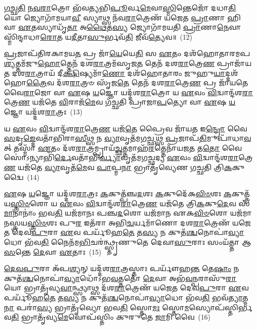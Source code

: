 \-\ul{𑌗}\-\-\ul{𑌚𑍍𑌛}\-\-\ul{𑌤𑌿} \ul{𑌨}\-\-\ul{𑌵}\-\-\ul{𑌰𑌾}\-𑌤𑍍𑌰𑍋 𑌭᳴𑌵𑌤𑍍𑌯𑌭𑌿\-\ul{𑌪𑍂}\-𑌰𑍍𑌵\-\ul{𑌮𑍇}\-𑌵𑌾\-\ul{𑌸𑍍𑌮𑌿}\-𑌨𑍍𑌤𑍇𑌜𑍋᳴ 𑌦𑌧𑌾\-\ul{𑌤𑌿} 𑌯𑍋 𑌜𑍍𑌯𑍋𑌗𑌾᳴𑌮𑌯𑌾\-\ul{𑌵𑍀} 𑌸𑍍𑌯𑌾𑌥𑍍𑌸 𑌨᳴𑌵\-\ul{𑌰𑌾}\-𑌤𑍍𑌰𑍇𑌣᳴ 𑌯𑌜𑍇𑌤 \ul{𑌪𑍍𑌰𑌾}\-𑌣𑌾 𑌹𑌿 𑌵𑌾 \ul{𑌏}\-𑌤𑌸𑍍𑌯𑌾𑌧𑍃᳴\-\ul{𑌤𑌾} 𑌅\-\ul{𑌥𑍈}\-𑌤\-\ul{𑌸𑍍𑌯} 𑌜𑍍𑌯𑍋𑌗𑌾᳴𑌮𑌯𑌤𑌿 \ul{𑌪𑍍𑌰𑌾}\-𑌣𑌾\-\ul{𑌨𑍇}\-𑌵𑌾𑌸𑍍𑌮𑌿᳴𑌨𑍍𑌦𑌾𑌧𑌾\-\ul{𑌰𑍋}\-𑌤 𑌯\-\ul{𑌦𑍀}\-𑌤𑌾\-\ul{𑌸𑍁}\-𑌰𑍍𑌭𑌵᳴\-\ul{𑌤𑌿} 𑌜𑍀𑌵᳴\-\ul{𑌤𑍍𑌯𑍇}\-𑌵॥~(12)

{\anuvakamend[{𑌕𑌲𑍍𑌪᳴𑌨𑍍𑌤𑍇 \ul{𑌪𑍍𑌰}\-𑌜𑌾\-\ul{𑌨𑌾}\-𑌨𑍍𑌤𑍍𑌰𑌯᳴𑌸𑍍𑌤𑍍𑌰𑌿𑍞𑌶𑌚𑍍𑌚}]}%

\-\ul{𑌪𑍍𑌰}\-𑌜𑌾𑌪᳴𑌤𑌿𑌰𑌕𑌾𑌮𑌯\-\ul{𑌤} 𑌪𑍍𑌰 𑌜𑌾᳴\-\ul{𑌯𑍇}\-𑌯𑍇\-\ul{𑌤𑌿} 𑌸 \ul{𑌏}\-𑌤𑌂 𑌦𑌶᳴𑌹𑍋𑌤𑌾𑌰𑌮𑌪\-\ul{𑌶𑍍𑌯}\-𑌤𑍍𑌤𑌮᳴𑌜𑍁\-\ul{𑌹𑍋}\-𑌤𑍍𑌤𑍇𑌨᳴ 𑌦𑌶\-\ul{𑌰𑌾}\-𑌤𑍍𑌰𑌮᳴𑌸𑍃𑌜\-\ul{𑌤} 𑌤𑍇𑌨᳴ 𑌦𑌶\-\ul{𑌰𑌾}\-𑌤𑍍𑌰𑍇\-\ul{𑌣} 𑌪𑍍𑌰𑌾𑌜𑌾᳴𑌯𑌤 𑌦𑌶\-\ul{𑌰𑌾}\-𑌤𑍍𑌰𑌾𑌯᳴ 𑌦𑍀\-\ul{𑌕𑍍𑌷𑌿}\-𑌷𑍍𑌯𑌮𑌾᳴\-\ul{𑌣𑍋} 𑌦𑌶᳴𑌹𑍋𑌤𑌾𑌰𑌂 𑌜𑍁𑌹𑍁\-\ul{𑌯𑌾}\-𑌦𑍍𑌦𑌶᳴𑌹𑍋\-\ul{𑌤𑍍𑌰𑍈}\-𑌵 𑌦᳴𑌶\-\ul{𑌰𑌾}\-𑌤𑍍𑌰𑍞 𑌸𑍃᳴𑌜\-\ul{𑌤𑍇} 𑌤𑍇𑌨᳴ 𑌦𑌶\-\ul{𑌰𑌾}\-𑌤𑍍𑌰𑍇\-\ul{𑌣} 𑌪𑍍𑌰 𑌜𑌾᳴𑌯𑌤𑍇 𑌵𑍈\-\ul{𑌰𑌾}\-𑌜𑍋 𑌵𑌾 \ul{𑌏}\-𑌷 \ul{𑌯}\-𑌜𑍍𑌞𑍋 𑌯𑌦𑍍𑌦᳴𑌶\-\ul{𑌰𑌾}\-𑌤𑍍𑌰𑍋 𑌯 \ul{𑌏}\-𑌵𑌂 \ul{𑌵𑌿}\-𑌦𑍍𑌵𑌾𑌨𑍍𑌦᳴𑌶\-\ul{𑌰𑌾}\-𑌤𑍍𑌰𑍇\-\ul{𑌣} 𑌯𑌜᳴𑌤𑍇 \ul{𑌵𑌿}\-𑌰𑌾𑌜᳴\-\ul{𑌮𑍇}\-𑌵 𑌗᳴𑌚𑍍𑌛𑌤𑌿 𑌪𑍍𑌰𑌾𑌜𑌾\-\ul{𑌪}\-𑌤𑍍𑌯𑍋 𑌵𑌾 \ul{𑌏}\-𑌷 \ul{𑌯}\-𑌜𑍍𑌞𑍋 𑌯𑌦𑍍𑌦᳴𑌶\-\ul{𑌰𑌾}\-𑌤𑍍𑌰𑌃~(13)

𑌯 \ul{𑌏}\-𑌵𑌂 \ul{𑌵𑌿}\-𑌦𑍍𑌵𑌾𑌨𑍍𑌦᳴𑌶\-\ul{𑌰𑌾}\-𑌤𑍍𑌰𑍇\-\ul{𑌣} 𑌯𑌜᳴\-\ul{𑌤𑍇} 𑌪𑍍𑌰𑍈𑌵 𑌜𑌾᳴𑌯\-\ul{𑌤} 𑌇\-\ul{𑌨𑍍𑌦𑍍𑌰𑍋} 𑌵𑍈 \ul{𑌸}\-𑌦𑍃\-\ul{𑌙𑍍𑌦𑍇}\-𑌵𑌤𑌾᳴𑌭𑌿𑌰𑌾\-\ul{𑌸𑍀}\-𑌥𑍍𑌸 𑌨 \ul{𑌵𑍍𑌯𑌾}\-𑌵𑍃𑌤᳴𑌮𑌗\-\ul{𑌚𑍍𑌛}\-𑌥𑍍𑌸 \ul{𑌪𑍍𑌰}\-𑌜𑌾𑌪᳴\-\ul{𑌤𑌿}\-𑌮𑍁𑌪𑌾᳴𑌧𑌾\-\ul{𑌵}\-𑌤𑍍 𑌤𑌸𑍍𑌮𑌾᳴ \ul{𑌏}\-𑌤𑌂 𑌦᳴𑌶\-\ul{𑌰𑌾}\-𑌤𑍍𑌰𑌮𑍍𑌪𑍍𑌰𑌾𑌯᳴\-\ul{𑌚𑍍𑌛}\-𑌤𑍍𑌤𑌮𑌾𑌹᳴\-\ul{𑌰}\-𑌤𑍍𑌤𑍇𑌨𑌾᳴𑌯𑌜\-\ul{𑌤} 𑌤\-\ul{𑌤𑍋} 𑌵𑍈 𑌸𑍋॑\-𑌽𑌨𑍍𑌯𑌾𑌭𑌿᳴\-\ul{𑌰𑍍𑌦𑍇}\-𑌵𑌤𑌾᳴𑌭𑌿\-\ul{𑌰𑍍𑌵𑍍𑌯𑌾}\-𑌵𑍃𑌤᳴𑌮𑌗\-\ul{𑌚𑍍𑌛}\-𑌦𑍍𑌯 \ul{𑌏}\-𑌵𑌂 \ul{𑌵𑌿}\-𑌦𑍍𑌵𑌾𑌨𑍍𑌦᳴𑌶\-\ul{𑌰𑌾}\-𑌤𑍍𑌰𑍇\-\ul{𑌣} 𑌯𑌜᳴𑌤𑍇 \ul{𑌵𑍍𑌯𑌾}\-𑌵𑍃𑌤᳴\-\ul{𑌮𑍇}\-𑌵 \ul{𑌪𑌾}\-𑌪𑍍𑌮\-\ul{𑌨𑌾} 𑌭𑍍𑌰𑌾𑌤𑍃᳴𑌵𑍍𑌯𑍇𑌣 𑌗𑌚𑍍𑌛𑌤𑌿 𑌤𑍍𑌰𑌿\-\ul{𑌕}\-𑌕𑍁𑌦𑍍𑌵𑍈~(14)

\-\ul{𑌏}\-𑌷 \ul{𑌯}\-𑌜𑍍𑌞𑍋 𑌯𑌦𑍍𑌦᳴𑌶\-\ul{𑌰𑌾}\-𑌤𑍍𑌰𑌃 \ul{𑌕}\-𑌕𑍁𑌤𑍍𑌪᳴𑌞𑍍𑌚\-\ul{𑌦}\-𑌶𑌃 \ul{𑌕}\-𑌕𑍁𑌦𑍇᳴𑌕\-\ul{𑌵𑌿}\-\-\ul{𑍞}\-𑌶𑌃 \ul{𑌕}\-𑌕𑍁𑌤𑍍𑌤𑍍𑌰᳴𑌯\-\ul{𑌸𑍍𑌤𑍍𑌰𑌿}\-\-\ul{𑍞}\-𑌶𑍋 𑌯 \ul{𑌏}\-𑌵𑌂 \ul{𑌵𑌿}\-𑌦𑍍𑌵𑌾𑌨𑍍𑌦᳴𑌶\-\ul{𑌰𑌾}\-𑌤𑍍𑌰𑍇\-\ul{𑌣} 𑌯𑌜᳴𑌤𑍇 𑌤𑍍𑌰𑌿\-\ul{𑌕}\-𑌕𑍁\-\ul{𑌦𑍇}\-𑌵 𑌸᳴\-\ul{𑌮𑌾}\-𑌨𑌾𑌨𑌾𑌂॑ 𑌭𑌵\-\ul{𑌤𑌿} 𑌯𑌜᳴𑌮𑌾𑌨𑌃 𑌪𑌞𑍍𑌚\-\ul{𑌦}\-𑌶𑍋 𑌯𑌜᳴𑌮𑌾𑌨 𑌏𑌕\-\ul{𑌵𑌿}\-\-\ul{𑍞}\-𑌶𑍋 𑌯𑌜᳴𑌮𑌾𑌨𑌸𑍍𑌤𑍍𑌰𑌯\-\ul{𑌸𑍍𑌤𑍍𑌰𑌿}\-\-\ul{𑍞}\-𑌶𑌃 𑌪𑍁\-\ul{𑌰} 𑌇𑌤᳴𑌰𑌾 𑌅𑌭𑌿\-\ul{𑌚}\-𑌰𑍍𑌯𑌮𑌾᳴𑌣𑍋 𑌦𑌶\-\ul{𑌰𑌾}\-𑌤𑍍𑌰𑍇𑌣᳴ 𑌯𑌜𑍇𑌤 𑌦𑍇𑌵\-\ul{𑌪𑍁}\-𑌰𑌾 \ul{𑌏}\-𑌵 𑌪𑌰𑍍𑌯𑍂᳴𑌹\-\ul{𑌤𑍇} 𑌤\-\ul{𑌸𑍍𑌯} 𑌨 𑌕𑍁𑌤᳴\-\ul{𑌶𑍍𑌚}\-𑌨𑍋𑌪𑌾॑\-\ul{𑌵𑍍𑌯𑌾}\-𑌧𑍋 𑌭᳴𑌵\-\ul{𑌤𑌿} 𑌨𑍈𑌨᳴𑌮\-\ul{𑌭𑌿}\-𑌚𑌰॑𑌨𑍍𑌥𑍍𑌸𑍍𑌤𑍃𑌣𑍁𑌤𑍇 𑌦𑍇𑌵𑌾\-\ul{𑌸𑍁}\-𑌰𑌾𑌃 𑌸𑌂𑌯᳴𑌤𑍍𑌤𑌾 𑌆\-\ul{𑌸}\-𑌨𑍍𑌤𑍇 \ul{𑌦𑍇}\-𑌵𑌾 \ul{𑌏}\-𑌤𑌾𑌃~(15)

\-\ul{𑌦𑍇}\-\-\ul{𑌵}\-\-\ul{𑌪𑍁}\-𑌰𑌾 𑌅᳴𑌪\-\ul{𑌶𑍍𑌯}\-𑌨𑍍 𑌯𑌦𑍍𑌦᳴𑌶\-\ul{𑌰𑌾}\-𑌤𑍍𑌰𑌸𑍍𑌤𑌾𑌃 𑌪𑌰𑍍𑌯𑍗᳴𑌹\-\ul{𑌨𑍍𑌤} 𑌤𑍇\-\ul{𑌷𑌾𑌂} 𑌨 𑌕𑍁𑌤᳴\-\ul{𑌶𑍍𑌚}\-𑌨𑍋𑌪𑌾॑\-\ul{𑌵𑍍𑌯𑌾}\-𑌧𑍋᳴\-𑌽𑌭\-\ul{𑌵}\-𑌤𑍍𑌤𑌤𑍋᳴ \ul{𑌦𑍇}\-𑌵𑌾 𑌅𑌭᳴\-\ul{𑌵}\-𑌨𑍍𑌪𑌰𑌾𑌸𑍁᳴\-\ul{𑌰𑌾} 𑌯𑍋 𑌭𑍍𑌰𑌾𑌤𑍃᳴𑌵𑍍𑌯\-\ul{𑌵𑌾}\-𑌨𑍍𑌥𑍍𑌸𑍍𑌯𑌾𑌥𑍍𑌸 𑌦᳴𑌶\-\ul{𑌰𑌾}\-𑌤𑍍𑌰𑍇𑌣᳴ 𑌯𑌜𑍇𑌤 𑌦𑍇𑌵\-\ul{𑌪𑍁}\-𑌰𑌾 \ul{𑌏}\-𑌵 𑌪𑌰𑍍𑌯𑍂᳴𑌹\-\ul{𑌤𑍇} 𑌤\-\ul{𑌸𑍍𑌯} 𑌨 𑌕𑍁𑌤᳴\-\ul{𑌶𑍍𑌚}\-𑌨𑍋𑌪𑌾॑\-\ul{𑌵𑍍𑌯𑌾}\-𑌧𑍋 𑌭᳴𑌵\-\ul{𑌤𑌿} 𑌭𑌵᳴\-\ul{𑌤𑍍𑌯𑌾}\-𑌤𑍍𑌮\-\ul{𑌨𑌾} 𑌪𑌰𑌾॑\-\ul{𑌸𑍍𑌯} 𑌭𑍍𑌰𑌾𑌤𑍃᳴𑌵𑍍𑌯𑍋 𑌭𑌵\-\ul{𑌤𑌿} 𑌸𑍍𑌤𑍋\-\ul{𑌮𑌃} 𑌸𑍍𑌤𑍋\-\ul{𑌮}\-𑌸𑍍𑌯𑍋𑌪᳴𑌸𑍍𑌤𑌿𑌰𑍍𑌭𑌵\-\ul{𑌤𑌿} 𑌭𑍍𑌰𑌾𑌤𑍃᳴𑌵𑍍𑌯\-\ul{𑌮𑍇}\-𑌵𑍋𑌪᳴𑌸𑍍𑌤𑌿𑌂 𑌕𑍁𑌰𑍁𑌤𑍇 \ul{𑌜𑌾}\-𑌮𑌿 𑌵𑍈~(16)

